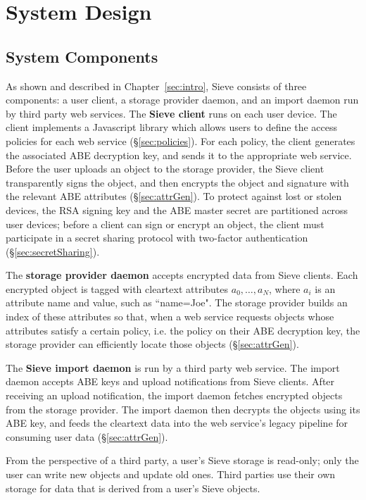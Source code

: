 \chapter{System Design}
\label{sec:design}

\section{System Components}
As shown and described in Chapter~\ref{sec:intro}, 
Sieve
consists of three components: a user client,
a storage provider daemon, and an import
daemon run by third party web
services. The \textbf{Sieve client} runs
on each user device. The client implements
a Javascript library which allows users to define the
access policies for each web service
(\S\ref{sec:policies}). For each policy, the
client generates the associated ABE
decryption key, and sends it to the
appropriate web service. Before the user
uploads an object to the storage provider,
the Sieve client transparently signs the
object, and then
encrypts the object and signature with the
relevant ABE attributes (\S\ref{sec:attrGen}).
To protect against lost or stolen devices,
the RSA signing key and the ABE master secret
are partitioned across user devices; before a
client can sign or encrypt an object, the
client must participate in a secret sharing
protocol with two-factor authentication
(\S\ref{sec:secretSharing}).

The \textbf{storage provider daemon}
accepts encrypted data from Sieve clients.
Each encrypted object is tagged with
cleartext attributes $a_0,\ldots,a_N$, where $a_i$
is an attribute name and value, such as 
``name=Joe". The storage provider
builds an index of these attributes so
that, when a web service requests objects whose
attributes satisfy a certain policy, i.e. the policy
on their ABE decryption key,
the storage provider can 
efficiently locate those objects (\S\ref{sec:attrGen}).

The \textbf{Sieve import daemon} is run
by a third party web service. The import
daemon accepts ABE keys and upload
notifications from Sieve clients. After
receiving an upload notification, the import
daemon fetches encrypted objects from the
storage provider. The import daemon then
decrypts the objects using its ABE key,
and feeds the cleartext data into the
web service's legacy pipeline for consuming
user data (\S\ref{sec:attrGen}).

From the perspective of a third party,
a user's Sieve storage is read-only;
only the user can write
new objects and update old ones. Third
parties use their own storage for data
that is derived from a user's Sieve
objects.

